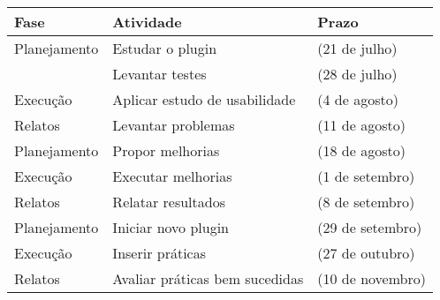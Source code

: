 \begin{table}[h]
\centering
\begin{tabular}{|l|l|l|}
\hline
\textbf{Fase}            & \textbf{Atividade}             & \textbf{Prazo} \\ \hline
Planejamento             & Estudar o plugin               & (21 de julho)          \\ \hline
                         & Levantar testes                & (28 de julho)          \\ \hline
Execução                 & Aplicar estudo de usabilidade  & (4 de agosto)          \\ \hline
Relatos                  & Levantar problemas             & (11 de agosto)          \\ \hline
Planejamento             & Propor melhorias               & (18 de agosto)          \\ \hline
Execução                 & Executar melhorias             & (1 de setembro)          \\ \hline
Relatos                  & Relatar resultados             & (8 de setembro)          \\ \hline
Planejamento             & Iniciar novo plugin            & (29 de setembro)          \\ \hline
Execução                 & Inserir práticas               & (27 de outubro)          \\ \hline
Relatos                  & Avaliar práticas bem sucedidas & (10 de novembro)          \\ \hline
\end{tabular}
\end{table}


